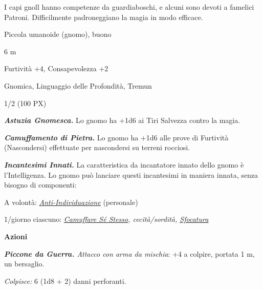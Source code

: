 \begin{multicols}{2}
{I capi gnoll hanno competenze da guardiaboschi, e alcuni sono devoti a famelici Patroni. Difficilmente padroneggiano la magia in modo efficace.

\begin{description}[noitemsep, topsep=0pt, parsep=0pt, partopsep=0pt, itemsep=1pt, leftmargin=2.35cm,  labelwidth=2.2cm, itemindent=0cm, listparindent=0pt] %
\setlength{\baselineskip}{10pt}
\item[\textbf{Taglia/Tipo}] Piccola umanoide (gnomo), buono
\item[\textbf{Caratt.}] 
\item[\textbf{Punti Ferita}] 
\item[\textbf{Movimento}] 6 m
\item[\textbf{Tiri Salvez.}] 
\item[\textbf{Comp.}] Furtività +4, Consapevolezza +2
\item[\textbf{Sensi}] 
\item[\textbf{Linguaggi}] Gnomica, Linguaggio delle Profondità, Tremun
\item[\textbf{Sfida}] 1/2 (100 PX)
\end{description}
\smallskip

\emph{\textbf{Astuzia Gnomesca.}} Lo gnomo ha +1d6 ai Tiri Salvezza contro la magia.

\emph{\textbf{Camuffamento di Pietra.}} Lo gnomo ha +1d6 alle prove di Furtività (Nascondersi) effettuate per nascondersi su terreni rocciosi.

\emph{\textbf{Incantesimi Innati.}} La caratteristica da incantatore innato dello gnomo è l'Intelligenza. Lo gnomo può lanciare questi incantesimi in maniera innata, senza bisogno di componenti:

A volontà: \emph{\hyperlink{Anti-Individuazione}{Anti-Individuazione}} (personale)

1/giorno ciascuno: \emph{\hyperlink{Camuffare Sé Stesso}{Camuffare Sé Stesso}, cecità/sordità, \hyperlink{Sfocatura}{Sfocatura}}

\textbf{Azioni}

\emph{\textbf{Piccone da Guerra.} Attacco con arma da mischia}: +4 a colpire, portata 1 m, un bersaglio.

\emph{Colpisce:} 6 (1d8 + 2) danni perforanti.

}
\end{multicols}
